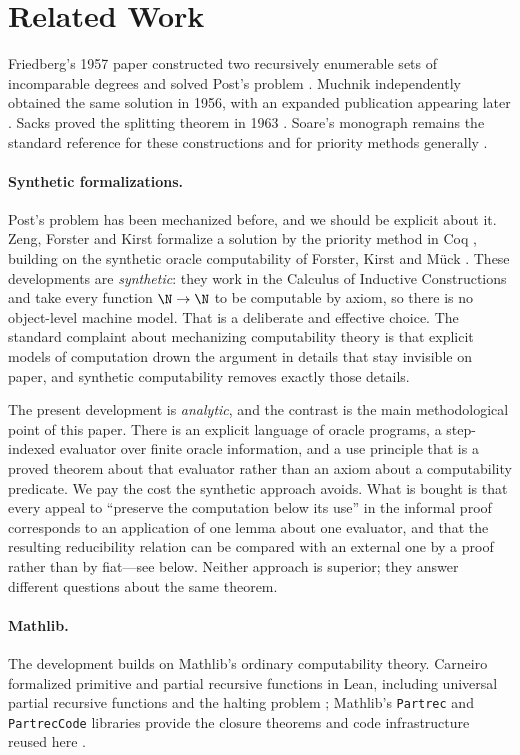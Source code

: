 \section{Related Work}

Friedberg's 1957 paper constructed two recursively enumerable sets of
incomparable degrees and solved Post's problem \cite{friedberg1957}.
Muchnik independently obtained the same solution in 1956, with an expanded
publication appearing later \cite{muchnik1956,muchnik1958}.  Sacks proved
the splitting theorem in 1963 \cite{sacks1963}.  Soare's monograph remains
the standard reference for these constructions and for priority methods
generally \cite{soare1987}.

\paragraph{Synthetic formalizations.}
Post's problem has been mechanized before, and we should be explicit about
it.  Zeng, Forster and Kirst formalize a solution by the priority method in
Coq \cite{zeng2024post}, building on the synthetic oracle computability of
Forster, Kirst and M\"uck \cite{forster2023oracle}.  These developments are
\emph{synthetic}: they work in the Calculus of Inductive Constructions and
take every function $\N \to \N$ to be computable by axiom, so there is no
object-level machine model.  That is a deliberate and effective choice.
The standard complaint about mechanizing computability theory is that
explicit models of computation drown the argument in details that stay
invisible on paper, and synthetic computability removes exactly those
details.

The present development is \emph{analytic}, and the contrast is the main
methodological point of this paper.  There is an explicit language of
oracle programs, a step-indexed evaluator over finite oracle information,
and a use principle that is a proved theorem about that evaluator rather
than an axiom about a computability predicate.  We pay the cost the
synthetic approach avoids.  What is bought is that every appeal to
``preserve the computation below its use'' in the informal proof
corresponds to an application of one lemma about one evaluator, and that
the resulting reducibility relation can be compared with an external one
by a proof rather than by fiat---see below.  Neither approach is superior;
they answer different questions about the same theorem.

\paragraph{Mathlib.}
The development builds on Mathlib's ordinary computability theory.
Carneiro formalized primitive and partial recursive functions in Lean,
including universal partial recursive functions and the halting problem
\cite{carneiro2019}; Mathlib's \texttt{Partrec} and \texttt{PartrecCode}
libraries provide the closure theorems and code infrastructure reused here
\cite{mathlibPartrec,mathlibPartrecCode}.

